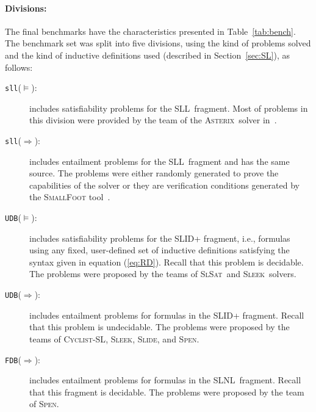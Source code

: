 \documentclass[twoside,11pt]{article}
\newcommand{\limp}{\Rightarrow}
\newcommand{\SLRD}{\textsc{SLID}}
\newcommand{\SLNL}{\textsc{SLNL}}
\newcommand{\SLL}{\textsc{SLL}}
\newcommand{\sllsat}{\texttt{sll}($\models$)}
\newcommand{\sllent}{\texttt{sll}($\limp$)}
\newcommand{\FDBent}{\texttt{FDB}($\limp$)}
\newcommand{\UDBsat}{\texttt{UDB}($\models$)}
\newcommand{\UDBent}{\texttt{UDB}($\limp$)}
\newcommand{\ASTERIX}{\textsc{Asterix}}
\newcommand{\CYCLIST}{\textsc{Cyclist-SL}}
\newcommand{\SLEEK}{\textsc{Sleek}}
\newcommand{\SLIDE}{\textsc{Slide}}
\newcommand{\SLSAT}{\textsc{SlSat}}
\newcommand{\SPEN}{\textsc{Spen}}
\begin{document}
\paragraph{Divisions:} The final benchmarks have the characteristics presented in Table~\ref{tab:bench}.
The benchmark set was split into five divisions, using the kind of problems solved and the kind of inductive definitions used (described in Section~\ref{sec:SL}), as follows:
\begin{description}
\item[\sllsat:] includes satisfiability problems for the \SLL\ fragment.
Most of problems in this division were provided by the team of the \ASTERIX\ solver in~\cite{PerezR11}.

\item[\sllent:] includes entailment problems for the \SLL\ fragment and has the same source. The problems were either randomly generated to prove the capabilities of the solver or they are verification conditions generated by the \textsc{SmallFoot} tool~\cite{SmallFootsite}.

\item[\UDBsat:] includes satisfiability problems for the \SLRD+ fragment, i.e., formulas using any fixed, user-defined set of inductive definitions satisfying the syntax given in equation (\ref{eq:RD}).
Recall that this problem is decidable. 
The problems were proposed by the teams of \SLSAT\ and \SLEEK\ solvers.

\item[\UDBent:] includes entailment problems for formulas in the \SLRD+ fragment.
Recall that this problem is undecidable. 
The problems were proposed by the teams of \CYCLIST, \SLEEK, \SLIDE, and \SPEN.

\item[\FDBent:] includes entailment problems for formulas in the \SLNL\ fragment. 
Recall that this fragment is decidable. %
The problems were proposed by the team of \SPEN.
\end{description} 
 
\end{document}
